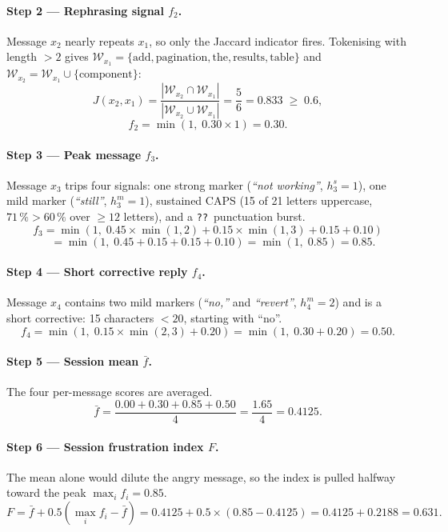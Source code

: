 \documentclass[11pt,a4paper]{article}
\newcommand{\calW}{\mathcal{W}}
\begin{document}
\paragraph{Step 2 --- Rephrasing signal $f_2$.}
Message $x_2$ nearly repeats $x_1$, so only the Jaccard indicator fires.
Tokenising with length $> 2$ gives
$\calW_{x_1} = \{\text{add}, \text{pagination}, \text{the},
\text{results}, \text{table}\}$ and
$\calW_{x_2} = \calW_{x_1} \cup \{\text{component}\}$:
\[
  J(x_2, x_1) = \frac{|\calW_{x_2} \cap \calW_{x_1}|}{|\calW_{x_2} \cup \calW_{x_1}|}
              = \frac{5}{6}
              = 0.833 \;\geq\; 0.6,
\]
\[
  f_2 = \min(1,\; 0.30 \times 1) = 0.30.
\]

\paragraph{Step 3 --- Peak message $f_3$.}
Message $x_3$ trips four signals: one strong marker
(\textit{``not working''}, $h^s_3 = 1$), one mild marker
(\textit{``still''}, $h^m_3 = 1$), sustained CAPS (15 of 21 letters
uppercase, $71\,\% > 60\,\%$ over $\geq 12$ letters), and a
\texttt{??}~punctuation burst.
\[
  f_3 = \min\!\left(1,\;
    0.45 \times \min(1,2)
    + 0.15 \times \min(1,3)
    + 0.15
    + 0.10
  \right)
\]
\[
  \phantom{f_3}
  = \min(1,\; 0.45 + 0.15 + 0.15 + 0.10)
  = \min(1,\; 0.85)
  = 0.85.
\]

\paragraph{Step 4 --- Short corrective reply $f_4$.}
Message $x_4$ contains two mild markers (\textit{``no,''} and
\textit{``revert''}, $h^m_4 = 2$) and is a short corrective: 15
characters $< 20$, starting with ``no''.
\[
  f_4 = \min\!\left(1,\; 0.15 \times \min(2,3) + 0.20\right)
      = \min(1,\; 0.30 + 0.20)
      = 0.50.
\]

\paragraph{Step 5 --- Session mean $\bar{f}$.}
The four per-message scores are averaged.
\[
  \bar{f} = \frac{0.00 + 0.30 + 0.85 + 0.50}{4}
          = \frac{1.65}{4}
          = 0.4125.
\]

\paragraph{Step 6 --- Session frustration index $F$.}
The mean alone would dilute the angry message, so the index is pulled
halfway toward the peak $\max_i f_i = 0.85$.
\[
  F = \bar{f} + 0.5\left(\max_i f_i - \bar{f}\right)
    = 0.4125 + 0.5 \times (0.85 - 0.4125)
    = 0.4125 + 0.2188
    = 0.631.
\]
\end{document}
